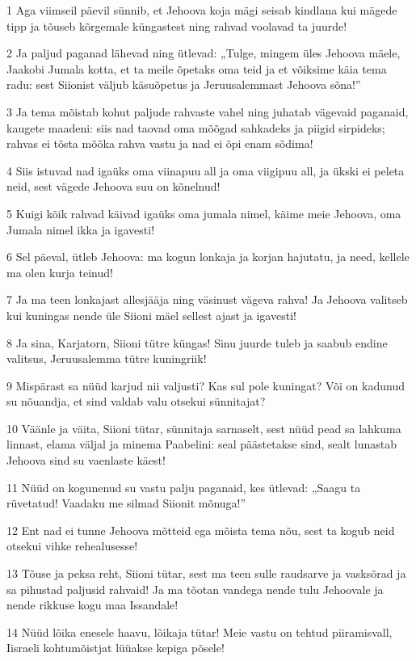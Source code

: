 \par 1 Aga viimseil päevil sünnib, et Jehoova koja mägi seisab kindlana kui mägede tipp ja tõuseb kõrgemale küngastest ning rahvad voolavad ta juurde!
\par 2 Ja paljud paganad lähevad ning ütlevad: „Tulge, mingem üles Jehoova mäele, Jaakobi Jumala kotta, et ta meile õpetaks oma teid ja et võiksime käia tema radu: sest Siionist väljub käsuõpetus ja Jeruusalemmast Jehoova sõna!”
\par 3 Ja tema mõistab kohut paljude rahvaste vahel ning juhatab vägevaid paganaid, kaugete maadeni: siis nad taovad oma mõõgad sahkadeks ja piigid sirpideks; rahvas ei tõsta mõõka rahva vastu ja nad ei õpi enam sõdima!
\par 4 Siis istuvad nad igaüks oma viinapuu all ja oma viigipuu all, ja ükski ei peleta neid, sest vägede Jehoova suu on kõnelnud!
\par 5 Kuigi kõik rahvad käivad igaüks oma jumala nimel, käime meie Jehoova, oma Jumala nimel ikka ja igavesti!
\par 6 Sel päeval, ütleb Jehoova: ma kogun lonkaja ja korjan hajutatu, ja need, kellele ma olen kurja teinud!
\par 7 Ja ma teen lonkajast allesjääja ning väsinust vägeva rahva! Ja Jehoova valitseb kui kuningas nende üle Siioni mäel sellest ajast ja igavesti!
\par 8 Ja sina, Karjatorn, Siioni tütre küngas! Sinu juurde tuleb ja saabub endine valitsus, Jeruusalemma tütre kuningriik!
\par 9 Mispärast sa nüüd karjud nii valjusti? Kas sul pole kuningat? Või on kadunud su nõuandja, et sind valdab valu otsekui sünnitajat?
\par 10 Väänle ja väita, Siioni tütar, sünnitaja sarnaselt, sest nüüd pead sa lahkuma linnast, elama väljal ja minema Paabelini: seal päästetakse sind, sealt lunastab Jehoova sind su vaenlaste käest!
\par 11 Nüüd on kogunenud su vastu palju paganaid, kes ütlevad: „Saagu ta rüvetatud! Vaadaku me silmad Siionit mõnuga!”
\par 12 Ent nad ei tunne Jehoova mõtteid ega mõista tema nõu, sest ta kogub neid otsekui vihke rehealusesse!
\par 13 Tõuse ja peksa reht, Siioni tütar, sest ma teen sulle raudsarve ja vasksõrad ja sa pihustad paljusid rahvaid! Ja ma tõotan vandega nende tulu Jehoovale ja nende rikkuse kogu maa Issandale!
\par 14 Nüüd lõika enesele haavu, lõikaja tütar! Meie vastu on tehtud piiramisvall, Iisraeli kohtumõistjat lüüakse kepiga põsele!

